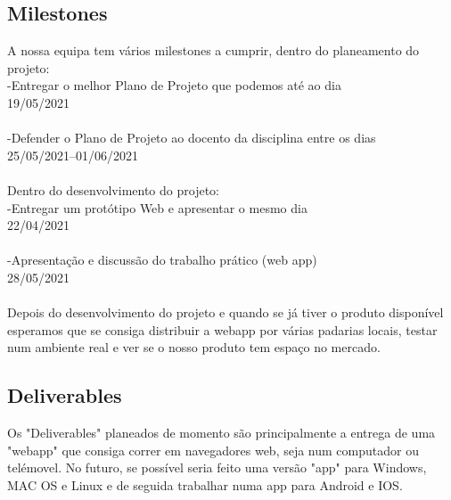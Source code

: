 \subsection{Milestones}
A nossa equipa tem vários milestones a cumprir, dentro do planeamento do projeto:
\\-Entregar o melhor Plano de Projeto que podemos até ao dia \\19/05/2021\\
\\-Defender o Plano de Projeto ao docento da disciplina entre os dias\\ 25/05/2021--01/06/2021\\
\\Dentro do desenvolvimento do projeto:
\\-Entregar um protótipo Web e apresentar o mesmo dia \\22/04/2021\\
\\-Apresentação e discussão do trabalho prático (web app) \\28/05/2021
\\\\Depois do desenvolvimento do projeto e quando se já tiver o produto disponível esperamos que se consiga distribuir a webapp por várias padarias locais, testar num ambiente real e ver se o nosso produto tem espaço no mercado.

\subsection{Deliverables}
Os "Deliverables" planeados de momento são principalmente a entrega de uma "webapp" que consiga correr em navegadores web, seja num computador ou telémovel. No futuro, se possível seria feito uma versão "app" para Windows, MAC OS e Linux e de seguida trabalhar numa app para Android e IOS.